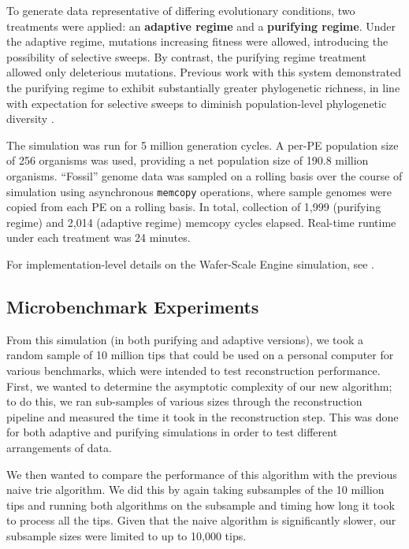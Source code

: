 To generate data representative of differing evolutionary conditions, two treatments were applied: an
\textbf{adaptive regime} and a \textbf{purifying regime}.
Under the adaptive regime, mutations increasing fitness were allowed, introducing the possibility of selective sweeps.
By contrast, the purifying regime treatment allowed only deleterious mutations.
Previous work with this system demonstrated the purifying regime to exhibit substantially greater phylogenetic richness, in line with expectation for selective sweeps to diminish population-level phylogenetic diversity \citep{moreno2024trackable}.

The simulation was run for 5 million generation cycles.
A per-PE population size of 256 organisms was used, providing a net population size of 190.8 million organisms.
``Fossil'' genome data was sampled on a rolling basis over the course of simulation using asynchronous \texttt{memcopy} operations, where sample genomes were copied from each PE on a rolling basis.
In total, collection of 1,999 (purifying regime) and 2,014 (adaptive regime) memcopy cycles elapsed.
Real-time runtime under each treatment was 24 minutes.

For implementation-level details on the Wafer-Scale Engine simulation, see \citep{moreno2024trackable}.


\subsection{Microbenchmark Experiments}

From this simulation (in both purifying and adaptive versions), we took a random sample of 10 million tips that could be used on a personal computer for various benchmarks, which were intended to test reconstruction performance.
First, we wanted to determine the asymptotic complexity of our new algorithm; to do this, we ran sub-samples of various sizes through the reconstruction pipeline and measured the time it took in the reconstruction step.
This was done for both adaptive and purifying simulations in order to test different arrangements of data.

We then wanted to compare the performance of this algorithm with the previous naive trie algorithm.
We did this by again taking subsamples of the 10 million tips and running both algorithms on the subsample and timing how long it took to process all the tips.
Given that the naive algorithm is significantly slower, our subsample sizes were limited to up to 10,000 tips.

